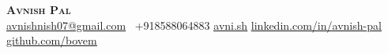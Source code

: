 \begin{center}
    \textbf{\Huge \scshape Avnish Pal} \\ \vspace{5pt}
    \href{mailto:avnishnish07@gmail.com}{ \underline{avnishnish07@gmail.com}} \quad
     \ \small +918588064883 \quad
    \href{https://www.avni.sh/}{ \underline{avni.sh}}  \quad
    \href{https://www.linkedin.com/in/avnish-pal}{ \underline{linkedin.com/in/avnish-pal}} \quad
    \href{https://github.com/bovem}{ \underline{github.com/bovem}}
\end{center}